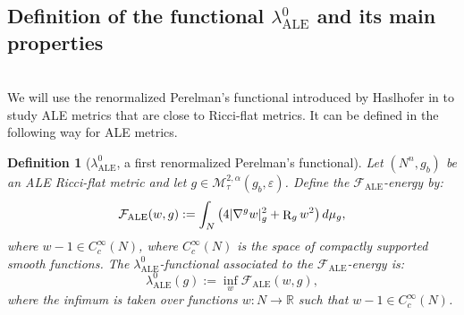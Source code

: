 \documentclass[a4paper,11pt,reqno]{amsart}
\newtheorem{defn}{Definition}[section]
\def\RR{\mathbb{R}}
\def\R{\mathop{\rm R}\nolimits}
\numberwithin{equation}{section}
\begin{document}
	\subsection{Definition of the functional $\lambda_{\operatorname{ALE}}^0$ and its main properties}\label{sec-def-fun-lambda-0}~~\\
	
	
	We will use the renormalized Perelman's functional introduced by Haslhofer in \cite{Has-Per-Fct} to study ALE metrics that are close to Ricci-flat metrics. It can be defined in the following way for ALE metrics.
	
	\begin{defn}[$\lambda_{\operatorname{ALE}}^0$, a first renormalized Perelman's functional]
		Let $(N^n,g_b)$ be an ALE Ricci-flat metric and let $g\in \mathcal{M}^{2,\alpha}_{\tau}(g_b,\varepsilon)$. Define the $\mathcal{F}_{\operatorname{ALE}}$-energy by:
		\begin{eqnarray}
		\mathcal{F}_{\operatorname{ALE}}(w,g):=\int_N\big(4|\nabla^g w|_g^2 +\R_g w^2 \big)\,d\mu_g, 
		\end{eqnarray}
		where $w-1\in C^{\infty}_c(N)$, where $C^{\infty}_c(N)$ is the space of compactly supported smooth functions.
		The $\lambda_{\operatorname{ALE}}^0$-functional associated to the $\mathcal{F}_{\operatorname{ALE}}$-energy is:
		$$\lambda_{\operatorname{ALE}}^0(g) := \inf_w \mathcal{F}_{\operatorname{ALE}}(w,g),$$
		where the infimum is taken over functions $w:N\rightarrow \RR$ such that $w-1\in C_c^\infty(N)$.
	\end{defn}
	
\end{document}
